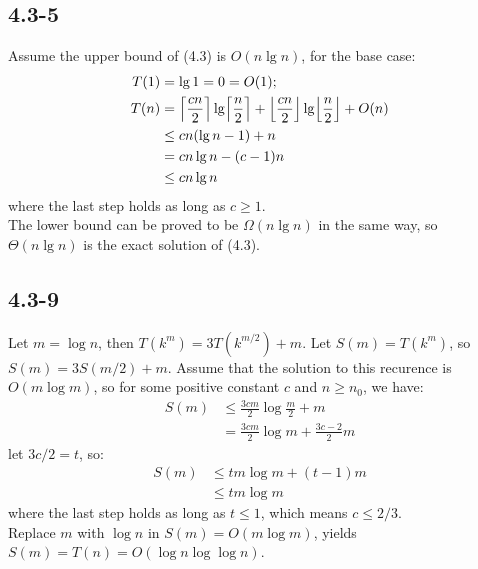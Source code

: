 \subsection{4.3-5}
    Assume the upper bound of (4.3) is $O(n\lg n)$, for the base case:
    \begin{align*}
        T(1) & = \lg 1 = 0 = O(1); \\
        T(n) & = \ceil[\Big]{\frac{cn}{2}}\lg \ceil[\Big]{\frac{n}{2}} +
                 \floor[\Big]{\frac{cn}{2}} \lg \floor[\Big]{\frac{n}{2}} +
                 O(n) \\
             & \le cn(\lg n - 1) + n \\
             & = cn\lg n - (c - 1)n \\
             & \le cn\lg n
    \end{align*}
    where the last step holds as long as $c \ge 1$. \\
    The lower bound can be proved to be $\Omega(n\lg n)$ in the same way, so
    $\Theta(n\lg n)$ is the exact solution of (4.3).
\subsection{4.3-9}
    Let $m = \log n$, then $T(k^m) = 3T(k^{m/2}) + m$. Let $S(m) = T(k^m)$, so
    $S(m) = 3S(m/2) + m$. Assume that the solution to this recurence is
    $O(m\log m)$, so for some positive constant $c$ and $n \ge n_0$, we have:
    \begin{align*}
        S(m) & \le \frac{3cm}{2}\log\frac{m}{2} + m \\
             & = \frac{3cm}{2}\log m + \frac{3c-2}{2}m
    \end{align*}
    let $3c/2 = t$, so:
    \begin{align*}
        S(m) & \le tm\log m + (t-1)m \\
             & \le tm\log m
    \end{align*}
    where the last step holds as long as $t \le 1$, which means $c \le 2/3$. \\
    Replace $m$ with $\log n$ in $S(m) = O(m\log m)$, yields
    $S(m) = T(n) = O(\log n \log \log n)$.
